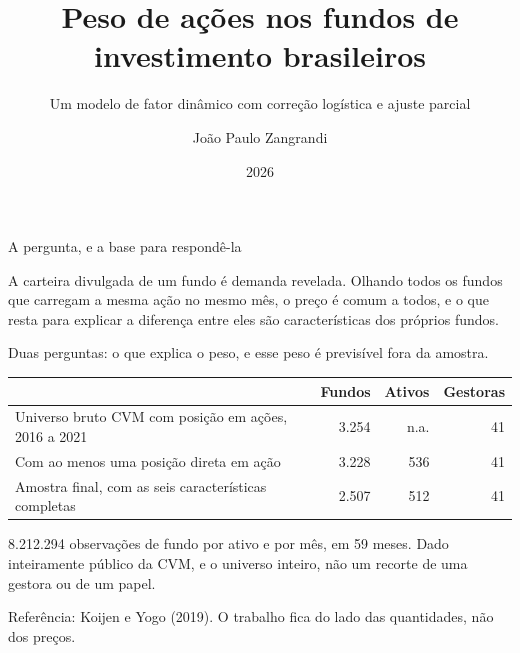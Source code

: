 \documentclass[aspectratio=169,11pt]{beamer}
\title[Peso de ações nos fundos brasileiros]%
      {Peso de ações nos fundos de investimento brasileiros}
\subtitle{Um modelo de fator dinâmico com correção logística e ajuste parcial}
\author[J. P. Zangrandi]{João Paulo Zangrandi}
\institute[FGV EESP]{Escola de Economia de São Paulo, Fundação Getulio Vargas\\[0.4em]
Orientador: Prof.\ Maurício Ferraresi Junior}
\date[2026]{2026}
\begin{document}
{
\begin{frame}[plain]
  \titlepage
\end{frame}}

\begin{frame}{A pergunta, e a base para respondê-la}

A carteira divulgada de um fundo é demanda revelada. Olhando todos os fundos que carregam
a mesma ação no mesmo mês, o preço é comum a todos, e o que resta para explicar a diferença
entre eles são características dos próprios fundos.

\vspace{0.5em}
Duas perguntas: o que explica o peso, e esse peso é previsível fora da amostra.

\vspace{1.0em}
\centering
\small
\begin{tabular}{@{}lrrr@{}}
\toprule
& Fundos & Ativos & Gestoras \\
\midrule
Universo bruto CVM com posição em ações, 2016 a 2021 & 3.254 & n.a. & 41 \\
Com ao menos uma posição direta em ação & 3.228 & 536 & 41 \\
Amostra final, com as seis características completas & 2.507 & 512 & 41 \\
\bottomrule
\end{tabular}

\vspace{0.9em}
\raggedright
\normalsize
8.212.294 observações de fundo por ativo e por mês, em 59 meses. Dado inteiramente público
da CVM, e o universo inteiro, não um recorte de uma gestora ou de um papel.

\vspace{0.5em}
\footnotesize
Referência: Koijen e Yogo (2019). O trabalho fica do lado das quantidades, não dos preços.

\end{frame}
\end{document}
